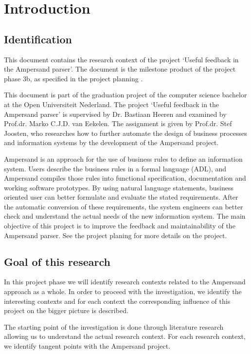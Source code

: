 
\section{Introduction}
\subsection{Identification}
This document contains the research context of the project `Useful feedback in the Ampersand parser'.
The document is the milestone product of the project phase 3b, as specified in the project planning .

This document is part of the graduation project of the computer science bachelor at the Open Universiteit Nederland.
The project `Useful feedback in the Ampersand parser' is supervised by Dr. Bastiaan Heeren and examined by Prof.dr. Marko C.J.D. van Eekelen.
The assignment is given by Prof.dr. Stef Joosten, who researches how to further automate the design of business processes and information systems by the development of the Ampersand project.

Ampersand is an approach for the use of business rules to define an information system.
Users describe the business rules in a formal language (ADL), and Ampersand compiles those rules into functional specification, documentation and working software prototypes. 
By using natural language statements, business oriented user can better formulate and evaluate the stated requirements.
After the automatic conversion of these requirements, the system engineers can better check and understand the actual needs of the new information system.
The main objective of this project is to improve the feedback and maintainability of the Ampersand parser.
See the project planing  for more details on the project.

\subsection{Goal of this research}
In this project phase we will identify research contexts related to the Ampersand approach as a whole.
In order to proceed with the investigation, we identify the interesting contexts and for each context the corresponding influence of this project on the bigger picture is described.

The starting point of the investigation is done through literature research allowing us to understand the actual research context.
For each research context, we identify tangent points with the Ampersand project.

